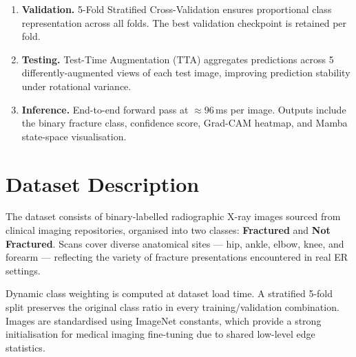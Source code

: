 \documentclass[12pt, a4paper]{article}
\begin{document}
\begin{enumerate}[label=\textbf{Stage \arabic*.}, leftmargin=*, itemsep=6pt]
  \item \textbf{Validation.}
  5-Fold Stratified Cross-Validation ensures proportional class representation across all folds.
  The best validation checkpoint is retained per fold.

  \item \textbf{Testing.}
  Test-Time Augmentation (TTA) aggregates predictions across 5 differently-augmented views of
  each test image, improving prediction stability under rotational variance.

  \item \textbf{Inference.}
  End-to-end forward pass at $\approx 96$\,ms per image. Outputs include the binary fracture class,
  confidence score, Grad-CAM heatmap, and Mamba state-space visualisation.

\end{enumerate}

\section{Dataset Description}

The dataset consists of binary-labelled radiographic X-ray images sourced from clinical imaging
repositories, organised into two classes: \textbf{Fractured} and \textbf{Not Fractured}. Scans
cover diverse anatomical sites — hip, ankle, elbow, knee, and forearm — reflecting the variety
of fracture presentations encountered in real ER settings.

Dynamic class weighting is computed at dataset load time. A stratified 5-fold split preserves the
original class ratio in every training/validation combination. Images are standardised using
ImageNet constants, which provide a strong initialisation for medical imaging fine-tuning due to
shared low-level edge statistics.
\end{document}

